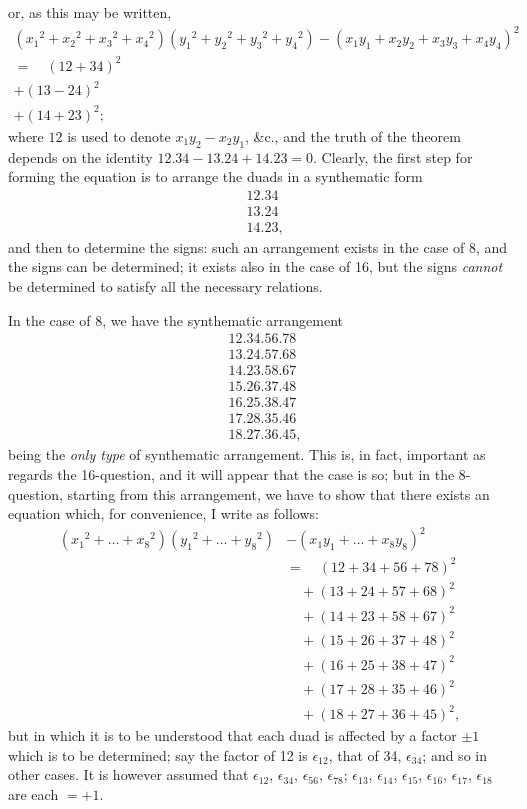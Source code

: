 \documentclass[11pt,a4paper,english]{article}
\theoremstyle{plain}
\begin{document}
or, as this may be written,
\begin{multline*}
({x_1}^2 + {x_2}^2 + {x_3}^2 + {x_4}^2)({y_1}^2 + {y_2}^2 + {y_3}^2 + {y_4}^2) - (x_1y_1 + x_2y_2 + x_3y_3 + x_4y_4)^2 \\
= \quad (12 + 34)^2 \\
+ (13 - 24)^2 \\
+ (14 + 23)^2;
\end{multline*}
where $12$ is used to denote $x_1y_2 - x_2y_1$, \&c., and the truth of the theorem depends on the identity $12.34 - 13.24 + 14.23 = 0$. Clearly, the first step for forming the equation is to arrange the duads in a synthematic form
\begin{align*}
&12.34 \\
&13.24 \\
&14.23,
\end{align*}
and then to determine the signs: such an arrangement exists in the case of 8, and the signs can be determined; it exists also in the case of 16, but the signs \textit{cannot} be determined to satisfy all the necessary relations.

In the case of 8, we have the synthematic arrangement
\begin{align*}
&12.34.56.78 \\
&13.24.57.68 \\
&14.23.58.67 \\
&15.26.37.48 \\
&16.25.38.47 \\
&17.28.35.46 \\
&18.27.36.45,
\end{align*}
being the \textit{only type} of synthematic arrangement. This is, in fact, important as regards the 16-question, and it will appear that the case is so; but in the 8-question, starting from this arrangement, we have to show that there exists an equation which, for convenience, I write as follows:
\begin{align*}
({x_1}^2 + \ldots + {x_8}^2)({y_1}^2 + \ldots + {y_8}^2) &- (x_1y_1 + \ldots + x_8y_8)^2 \\
&= \quad (12 + 34 + 56 + 78)^2 \\
&\quad + (13 + 24 + 57 + 68)^2 \\
&\quad + (14 + 23 + 58 + 67)^2 \\
&\quad + (15 + 26 + 37 + 48)^2 \\
&\quad + (16 + 25 + 38 + 47)^2 \\
&\quad + (17 + 28 + 35 + 46)^2 \\
&\quad + (18 + 27 + 36 + 45)^2,
\end{align*}
but in which it is to be understood that each duad is affected by a factor $\pm 1$ which is to be determined; say the factor of 12 is $\epsilon_{12}$, that of 34, $\epsilon_{34}$; and so in other cases. It is however assumed that $\epsilon_{12}$, $\epsilon_{34}$, $\epsilon_{56}$, $\epsilon_{78}$; $\epsilon_{13}$, $\epsilon_{14}$, $\epsilon_{15}$, $\epsilon_{16}$, $\epsilon_{17}$, $\epsilon_{18}$ are each $= +1$.
\end{document}
